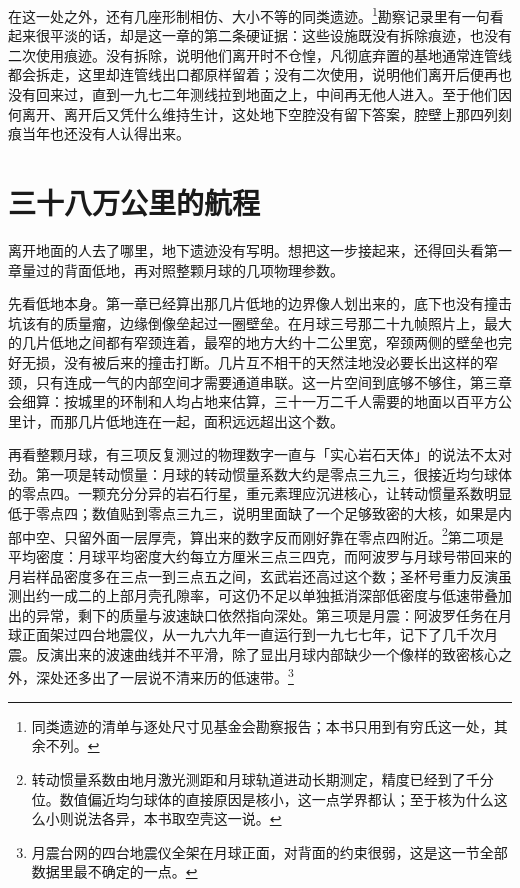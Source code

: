 在这一处之外，还有几座形制相仿、大小不等的同类遗迹。\footnote{同类遗迹的清单与逐处尺寸见基金会勘察报告；本书只用到有穷氏这一处，其余不列。}勘察记录里有一句看起来很平淡的话，却是这一章的第二条硬证据：这些设施既没有拆除痕迹，也没有二次使用痕迹。没有拆除，说明他们离开时不仓惶，凡彻底弃置的基地通常连管线都会拆走，这里却连管线出口都原样留着；没有二次使用，说明他们离开后便再也没有回来过，直到一九七二年测线拉到地面之上，中间再无他人进入。至于他们因何离开、离开后又凭什么维持生计，这处地下空腔没有留下答案，腔壁上那四列刻痕当年也还没有人认得出来。

\section{三十八万公里的航程}

离开地面的人去了哪里，地下遗迹没有写明。想把这一步接起来，还得回头看第一章量过的背面低地，再对照整颗月球的几项物理参数。

先看低地本身。第一章已经算出那几片低地的边界像人划出来的，底下也没有撞击坑该有的质量瘤，边缘倒像垒起过一圈壁垒。在月球三号那二十九帧照片上，最大的几片低地之间都有窄颈连着，最窄的地方大约十二公里宽，窄颈两侧的壁垒也完好无损，没有被后来的撞击打断。几片互不相干的天然洼地没必要长出这样的窄颈，只有连成一气的内部空间才需要通道串联。这一片空间到底够不够住，第三章会细算：按城里的环制和人均占地来估算，三十一万二千人需要的地面以百平方公里计，而那几片低地连在一起，面积远远超出这个数。

再看整颗月球，有三项反复测过的物理数字一直与「实心岩石天体」的说法不太对劲。第一项是转动惯量：月球的转动惯量系数大约是零点三九三，很接近均匀球体的零点四。一颗充分分异的岩石行星，重元素理应沉进核心，让转动惯量系数明显低于零点四；数值贴到零点三九三，说明里面缺了一个足够致密的大核，如果是内部中空、只留外面一层厚壳，算出来的数字反而刚好靠在零点四附近。\footnote{转动惯量系数由地月激光测距和月球轨道进动长期测定，精度已经到了千分位。数值偏近均匀球体的直接原因是核小，这一点学界都认；至于核为什么这么小则说法各异，本书取空壳这一说。}第二项是平均密度：月球平均密度大约每立方厘米三点三四克，而阿波罗与月球号带回来的月岩样品密度多在三点一到三点五之间，玄武岩还高过这个数；圣杯号重力反演虽测出约一成二的上部月壳孔隙率，可这仍不足以单独抵消深部低密度与低速带叠加出的异常，剩下的质量与波速缺口依然指向深处。第三项是月震：阿波罗任务在月球正面架过四台地震仪，从一九六九年一直运行到一九七七年，记下了几千次月震。反演出来的波速曲线并不平滑，除了显出月球内部缺少一个像样的致密核心之外，深处还多出了一层说不清来历的低速带。\footnote{月震台网的四台地震仪全架在月球正面，对背面的约束很弱，这是这一节全部数据里最不确定的一点。}

